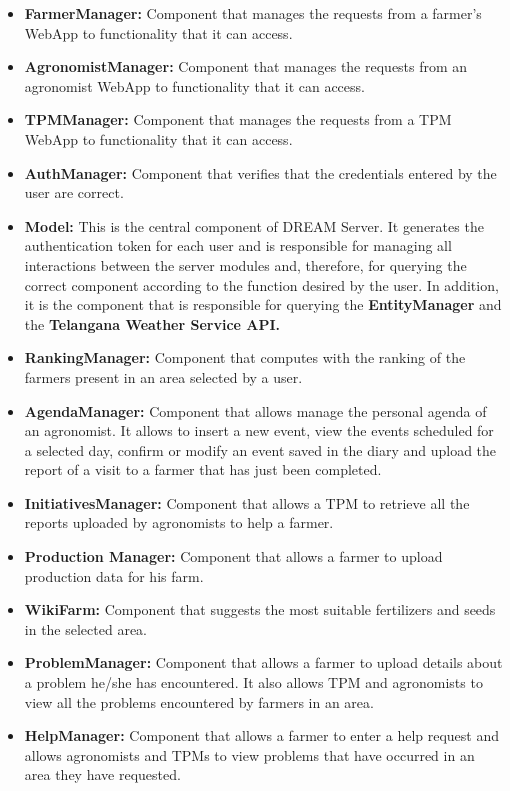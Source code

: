 \begin{itemize}
    \item \textbf{FarmerManager:} Component that manages the requests from a farmer's WebApp to functionality that it can access.
    \item \textbf{AgronomistManager:} Component that manages the requests from an agronomist WebApp to functionality that it can access.
    \item \textbf{TPMManager:} Component that manages the requests from a TPM WebApp to functionality that it can access.
    \item \textbf{AuthManager:} Component that verifies that the credentials entered by the user are correct.
    \item \textbf{Model:} This is the central component of DREAM Server. It generates the authentication token for each user and is responsible for managing all interactions between the server modules and, therefore, for querying the correct component according to the function desired by the user. In addition, it is the component that is responsible for querying the \textbf{EntityManager} and the \textbf{Telangana Weather Service API.}
    \item \textbf{RankingManager:} Component that computes with the ranking of the farmers present in an area selected by a user.
    \item \textbf{AgendaManager:} Component that allows manage the personal agenda of an agronomist. It allows to insert a new event, view the events scheduled for a selected day, confirm or modify an event saved in the diary and upload the report of a visit to a farmer that has just been completed.
    \item \textbf{InitiativesManager:} Component that allows a TPM to retrieve all the reports uploaded by agronomists to help a farmer.
    \item \textbf{Production Manager:} Component that allows a farmer to upload production data for his farm.
    \item \textbf{WikiFarm:} Component that suggests the most suitable fertilizers and seeds in the selected area.
    \item \textbf{ProblemManager:} Component that allows a farmer to upload details about a problem he/she has encountered. It also allows TPM and agronomists to view all the problems encountered by farmers in an area.
    \item \textbf{HelpManager:} Component that allows a farmer to enter a help request and allows agronomists and TPMs to view problems that have occurred in an area they have requested.

\end{itemize}
